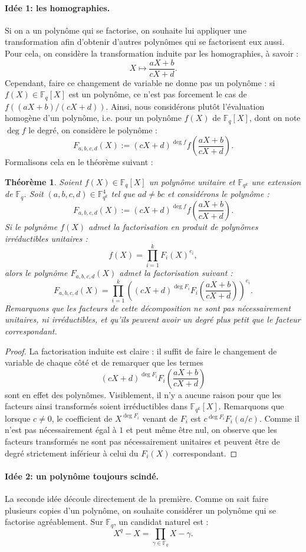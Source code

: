 \documentclass[a4paper, titlepage, 11pt]{article}
\newtheorem{theo}{Théorème}[section]
\theoremstyle{definition}
\theoremstyle{remark}
\def\gf #1{\mathbb{F}_{#1}}
\begin{document}
\paragraph{Idée 1: les homographies.} Si on a un polynôme qui se factorise, on souhaite lui appliquer une transformation afin d'obtenir d'autres polynômes qui se factorisent eux aussi. Pour cela, on considère la transformation induite par les homographies, à savoir :
$$X \mapsto \frac{aX+b}{cX+d}.$$
Cependant, faire ce changement de variable ne donne pas un polynôme : si $f(X) \in\gf{q}[X]$ est un polynôme, ce n'est pas forcement le cas de $f((aX+b)/(cX+d))$. Ainsi, nous considérons plutôt l'évaluation homogène d'un polynôme, i.e. pour un polynôme $f(X)$ de $\gf{q}[X]$, dont on note $\deg f$ le degré, on considère le polynôme :
$$F_{a,b,c,d}(X) := (cX+d)^{\deg f} f \left(\frac{aX+b}{cX+d}\right).$$
Formalisons cela en le théorème suivant :
\begin{theo}
Soient $f(X) \in \gf{q}[X]$ un polynôme unitaire et $\gf{q^k}$ une extension de $\gf{q}$. Soit $(a,b,c,d) \in \gf{q^k}^4$ tel que $ad \neq bc$ et considérons le polynôme :
$$F_{a,b,c,d}(X) := (cX+d)^{\deg f} f \left(\frac{aX+b}{cX+d}\right).$$
Si le polynôme $f(X)$ admet la factorisation en produit de polynômes irréductibles unitaires : $$f(X) = \prod_{i=1}^k F_i(X)^{e_i},$$
alors le polynôme $F_{a,b,c,d}(X)$ admet la factorisation suivant :
$$F_{a,b,c,d}(X) = \prod_{i=1}^k {\left( (cX+d)^{\deg F_i} F_i\left(\frac{aX+b}{cX+d}\right)\right)}^{e_i}.$$
Remarquons que les facteurs de cette décomposition ne sont pas nécessairement unitaires, ni irréductibles, et qu'ils peuvent avoir un degré plus petit que le facteur correspondant.
\end{theo}
\begin{proof}
La factorisation induite est claire : il suffit de faire le changement de variable de chaque côté et de remarquer que les termes
$$(cX+d)^{\deg F_i} F_i\left(\frac{aX+b}{cX+d}\right)$$
sont en effet des polynômes. Visiblement, il n'y a aucune raison pour que les facteurs ainsi transformés soient irréductibles dans $\gf{q^k}[X]$. Remarquons que lorsque $c \neq 0$, le coefficient de $X^{\deg{F_i}}$ venant de $F_i$ est $c^{\deg F_i}F_i(a/c)$. Comme il n'est pas nécessairement égal à $1$ et peut même être nul, on observe que les facteurs transformés ne sont pas nécessairement unitaires et peuvent être de degré strictement inférieur à celui du $F_i(X)$ correspondant.
\end{proof}

\paragraph{Idée 2: un polynôme toujours scindé.} La seconde idée découle directement de la première. Comme on sait faire plusieurs \og{}copies\fg{} d'un polynôme, on souhaite considérer un polynôme qui se factorise agréablement. Sur $\gf{q}$, un candidat naturel est : $$X^q -X = \prod_{\gamma\in\gf{q}} X-\gamma.$$
\end{document}
